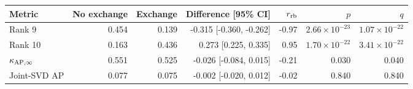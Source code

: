 \begin{tabular}{lrrrrrr}
\toprule
Metric & No exchange & Exchange & Difference [95\% CI] & $r_{\rm rb}$ & $p$ & $q$ \\
\midrule
Rank 9 & 0.454 & 0.139 & -0.315 [-0.360, -0.262] & -0.97 & $2.66\times10^{-23}$ & $1.07\times10^{-22}$ \\
Rank 10 & 0.163 & 0.436 & 0.273 [0.225, 0.335] & 0.95 & $1.70\times10^{-22}$ & $3.41\times10^{-22}$ \\
$\kappa_{{\rm AP},\infty}$ & 0.551 & 0.525 & -0.026 [-0.084, 0.015] & -0.21 & 0.030 & 0.040 \\
Joint-SVD AP & 0.077 & 0.075 & -0.002 [-0.020, 0.012] & -0.02 & 0.840 & 0.840 \\
\bottomrule
\end{tabular}
